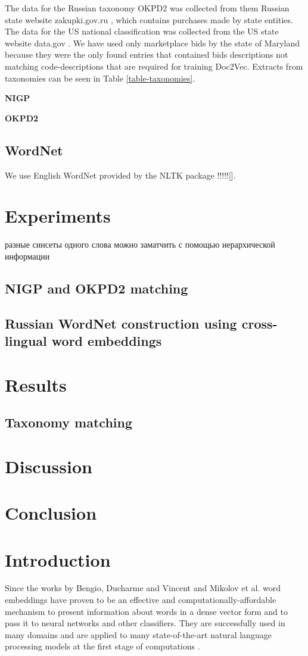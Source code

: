 \documentclass[11pt,a4paper]{article}
\begin{document}
The data for the Russian taxonomy OKPD2 was collected from them Russian state website zakupki.gov.ru \cite{gos-zakupki}, which contains purchases made by state entities.
The data for the US national classification was collected from the US state website data.gov \cite{data-gov}. We have used only marketplace bids by the state of Maryland because they were the only found entries that contained bids descriptions not matching code-descriptions that are required for training Doc2Vec. Extracts from taxonomies can be seen in Table \ref{table-taxonomies}.

\textbf{NIGP}

\textbf{OKPD2}
\subsection{WordNet}
We use English WordNet provided by the NLTK package !!!!![].
\section{Experiments}
\foreignlanguage{russian}{разные синсеты одного слова можно заматчить с помощью иерархической информации}
\subsection{NIGP and OKPD2 matching}
\subsection{Russian WordNet construction using cross-lingual word embeddings}
\section{Results}
\subsection{Taxonomy matching}
\section{Discussion}
\section{Conclusion}


\section{Introduction}
Since the works by Bengio, Ducharme and Vincent \cite{bengio} and Mikolov et al. \cite{mikolov-representations-2013} word embeddings have proven to be an effective and computationally-affordable mechanism to present information about words in a dense vector form and to pass it to neural networks and other classifiers. They are successfully used in many domains and are applied to many state-of-the-art natural language processing models at the first stage of computations \cite{levy-goldberg-2015}.
\end{document}
